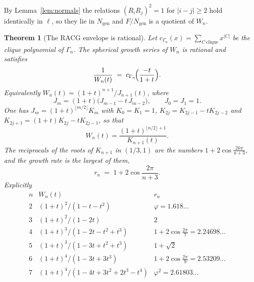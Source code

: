\documentclass[11pt]{article}
\newtheorem{theorem}{Theorem}
\theoremstyle{definition}
\begin{document}
By Lemma~\ref{lem:normals} the relations $(R_iR_j)^2=1$ for $|i-j|\ge2$ hold identically in $\ell$, so
they lie in $N_{\mathrm{gen}}$ and $F/N_{\mathrm{gen}}$ is a quotient of $W_n$.

\begin{theorem}[The RACG envelope is rational]
\label{thm:envelope}
Let $c_{\Gamma_n}(x)=\sum_{C\ \mathrm{clique}}x^{|C|}$ be the clique polynomial of $\Gamma_n$. The
spherical growth series of $W_n$ is rational and satisfies
\[
   \frac{1}{W_n(t)}\;=\;c_{\Gamma_n}\!\Bigl(\frac{-t}{1+t}\Bigr).
\]
Equivalently $W_n(t)=(1+t)^{n+1}/J_{n+1}(t)$, where
\[
   J_m=(1+t)\bigl(J_{m-1}-t\,J_{m-2}\bigr),\qquad J_0=J_1=1 .
\]
One has $J_m=(1+t)^{\lfloor m/2\rfloor}K_m$ with $K_0=K_1=1$, $K_{2j}=K_{2j-1}-tK_{2j-2}$ and
$K_{2j+1}=(1+t)K_{2j}-tK_{2j-1}$, so that
\[
   W_n(t)=\frac{(1+t)^{\lfloor n/2\rfloor+1}}{K_{n+1}(t)} .
\]
The reciprocals of the roots of $K_{n+1}$ in $(1/3,1)$ are the numbers $1+2\cos\frac{2k\pi}{n+3}$, and
the growth rate is the largest of them,
\[
   r_n\;=\;1+2\cos\frac{2\pi}{n+3}.
\]
Explicitly
\[
\renewcommand{\arraystretch}{1.4}
\begin{array}{c|c|c}
n & W_n(t) & r_n\\\hline
2 & (1+t)^2/(1-t-t^2) & \varphi=1.618\ldots\\
3 & (1+t)^2/(1-2t) & 2\\
4 & (1+t)^3/(1-2t-t^2+t^3) & 1+2\cos\tfrac{2\pi}7=2.24698\ldots\\
5 & (1+t)^3/(1-3t+t^2+t^3) & 1+\sqrt2\\
6 & (1+t)^4/(1-3t+3t^3) & 1+2\cos\tfrac{2\pi}9=2.53209\ldots\\
7 & (1+t)^4/(1-4t+3t^2+2t^3-t^4) & \varphi^2=2.61803\ldots
\end{array}
\]
\end{theorem}
\end{document}
